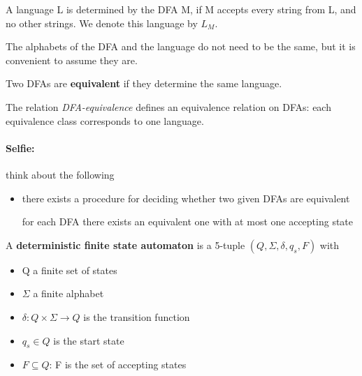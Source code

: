 \begin{definition}
A language L is determined by the DFA M, if M accepts every string
from L, and no other strings. We denote this language by $L_M$.
\end{definition}

The alphabets of the DFA and the language do not need to be the same,
but it is convenient to assume they are.

\begin{definition}
Two DFAs are {\bf equivalent} if they determine the same language.
\end{definition}

The relation {\em DFA-equivalence} defines an equivalence relation on
DFAs: each equivalence class corresponds to one language.


\paragraph{Selfie:} think about the following

\begin{itemize}
\item[] there exists a procedure for deciding whether two given DFAs
  are equivalent

for each DFA there exists an equivalent one with at most one accepting
state

\end{itemize}


\begin{definition} \label{dfadef}
A {\bf deterministic finite state automaton} is a 5-tuple
$(Q,\Sigma,\delta,q_s,F)$ with
\begin{itemize}
\item Q a finite set of states
\item $\Sigma$ a finite alphabet
\item $\delta: Q \times \Sigma \to Q$ is the transition function
\item $q_s \in Q$ is the start state
\item $F \subseteq Q$: F is the set of accepting states
\end{itemize}
\end{definition}


